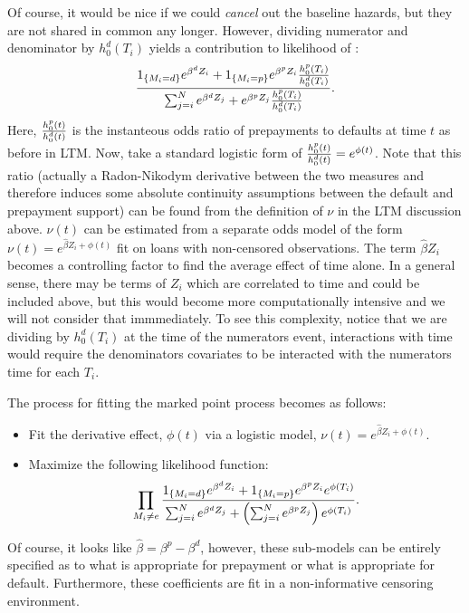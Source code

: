 \documentclass[10pt]{article}
\begin{document}
Of course, it would be nice if we could {\em cancel} out the baseline hazards, but they are not shared in common any longer.  However, dividing numerator and 
denominator by $h^d_0(T_i)$ yields a contribution to likelihood of :
$$ {{1_{\{M_i=d\}}e^{\beta^d Z_i}+1_{\{M_i=p\}}e^{\beta^p Z_i}{h^p_0(T_i)\over h^d_0(T_i)} } 
\over { \sum_{j=i}^N e^{\beta^d Z_j}+e^{\beta^p Z_j}{h^p_0(T_i)\over h^d_0(T_i)} } }.$$
Here, ${h^p_0(t)\over h^d_0(t)}$ is the instanteous odds ratio of prepayments to defaults at time $t$ as before in LTM.  Now, take a standard logistic form of 
${h^p_0(t)\over h^d_0(t)}={e^{\phi(t)}}$. Note that this ratio (actually a Radon-Nikodym derivative between the two measures and therefore induces some 
absolute continuity assumptions between the default and prepayment support) can be found from the definition of $\nu$ in the LTM discussion above.  
$\nu(t)$ can be estimated from a separate odds model of the form $\nu(t)=e^{\hat{\beta}Z_i+\phi(t)}$ fit on loans with non-censored observations.  The 
term ${\hat{\beta}Z_i}$ becomes a controlling factor to find the average effect of time alone.  In a general sense, there may be terms of $Z_i$ which are 
correlated to time and could be included above, but this would become more computationally intensive and we will not consider that immmediately. To see this 
complexity, notice that we are dividing by $h^d_0(T_i)$ at the time of the numerators event, interactions with time would require the denominators covariates
to be interacted with the numerators time for each $T_i$.  


The process for fitting the marked point process becomes as follows:
\begin{itemize}
\item Fit the derivative effect, $\phi(t)$ via a logistic model, $\nu(t)=e^{\hat{\beta}Z_i+\phi(t)}$.

\item Maximize the following likelihood function:
$$\prod_{M_i \not = e} {{1_{\{M_i=d\}}e^{\beta^d Z_i}+1_{\{M_i=p\}}e^{\beta^p Z_i}e^{\phi(T_i)} }
\over { \sum_{j=i}^N e^{\beta^d Z_j}+\left({\sum_{j=i}^N e^{\beta^p Z_j}}\right)e^{\phi(T_i)} } }. $$
\end{itemize}

Of course, it looks like $\hat{\beta}=\beta^p-\beta^d$, however, these sub-models can be entirely specified as to what is appropriate for prepayment or what is
appropriate for default. Furthermore, these coefficients are fit in a non-informative censoring environment.
\end{document}
